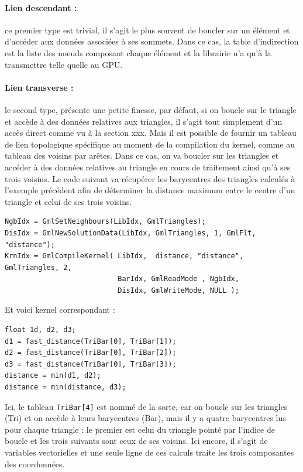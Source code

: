 \documentclass[a4paper,12pt]{article}
\begin{document}
\paragraph{Lien descendant :} ce premier type est trivial, il s'agit le plus souvent de boucler sur un élément et d'accéder aux données associées à ses sommets. Dans ce cas, la table d'indirection est la liste des noeuds composant chaque élément et la librairie n'a qu'à la transmettre telle quelle au GPU.

\paragraph{Lien transverse :} le second type, présente une petite finesse, par défaut, si on boucle sur le triangle et accède à des données relatives aux triangles, il s'agit tout simplement d'un accès direct comme vu à la section xxx. Mais il est possible de fournir un tableau de lien topologique spécifique au moment de la compilation du kernel, comme au tableau des voisins par arêtes. Dans ce cas, on va boucler sur les triangles et accéder à des données relatives au triangle en cours de traitement ainsi qu'à ses trois voisins.
Le code suivant va récupérer les barycentres des triangles calculés à l'exemple précédent afin de déterminer la distance maximum entre le centre d'un triangle et celui de ses trois voisins.

\begin{tt}
\begin{verbatim}
NgbIdx = GmlSetNeighbours(LibIdx, GmlTriangles);
DisIdx = GmlNewSolutionData(LibIdx, GmlTriangles, 1, GmlFlt, "distance");
KrnIdx = GmlCompileKernel( LibIdx,  distance, "distance", GmlTriangles, 2,
                           BarIdx, GmlReadMode , NgbIdx,
                           DisIdx, GmlWriteMode, NULL );
\end{verbatim}
\end{tt}
\normalfont

Et voici kernel correspondant :

\begin{tt}
\begin{verbatim}
float 1d, d2, d3;
d1 = fast_distance(TriBar[0], TriBar[1]);
d2 = fast_distance(TriBar[0], TriBar[2]);
d3 = fast_distance(TriBar[0], TriBar[3]);
distance = min(d1, d2);
distance = min(distance, d3);
\end{verbatim}
\end{tt}
\normalfont

Ici, le tableau {\tt TriBar[4]} est nommé de la sorte, car on boucle sur les triangles (Tri) et on accède à leurs barycentres (Bar), mais il y a quatre barycentres lus pour chaque triangle : le premier est celui du triangle pointé par l'indice de boucle et les trois suivants sont ceux de ses voisins. Ici encore, il s'agit de variables vectorielles et une seule ligne de ces calculs traite les trois composantes des coordonnées.
\end{document}
